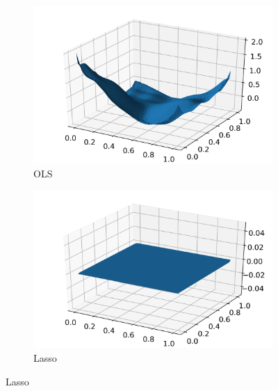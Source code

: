 \documentclass[../main.tex]{subfiles}
\begin{document}
\begin{figure}[h]
    \centering
    \begin{subfigure}[b]{0.48\textwidth}
        \centering
        \includegraphics[width=\textwidth]{../assets/ols_franke_plot.png}
        \caption{OLS}
        \label{fig:result_ols_plot}
    \end{subfigure}
    \quad
    \begin{subfigure}[b]{0.48\textwidth}
        \centering
        \includegraphics[width=\textwidth]{../assets/lasso_franke_plot.png}
        \caption{Lasso}
    \end{subfigure}
    

\end{figure}
\end{document}
